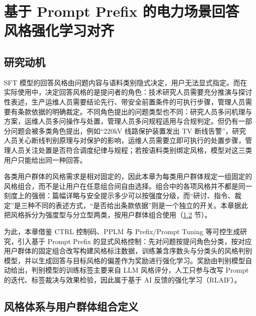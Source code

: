 \documentclass[fontset=fandol,type=master,campus=shenzhen,etitleauto=true]{hithesisbook}
\begin{document}
\chapter{基于 Prompt Prefix 的电力场景回答风格强化学习对齐}\label{ux57faux4e8e-prompt-prefix-ux7684ux7535ux529bux573aux666fux56deux7b54ux98ceux683cux5f3aux5316ux5b66ux4e60ux5bf9ux9f50}

\section{研究动机}\label{ux7814ux7a76ux52a8ux673a-1}

SFT 模型的回答风格由问题内容与语料类别隐式决定，用户无法显式指定。而在实际使用中，决定回答风格的是提问者的角色：技术研究人员需要充分推演与探讨性表述，生产运维人员需要结论先行、带安全前置条件的可执行步骤，管理人员需要有条款依据的明确裁定。不同角色提出的问题类型也不同：研究人员多问机理与方案，运维人员多问操作与处置，管理人员多问规程适用与合规判定。但仍有一部分问题会被多类角色提出，例如“220kV 线路保护装置发出 TV 断线告警”，研究人员关心断线判别原理与对保护的影响，运维人员需要立即可执行的处置步骤，管理人员关注处置是否符合调度纪律与规程；若按语料类别绑定风格，模型对这三类用户只能给出同一种回答。

各类用户群体的风格需求是相对固定的，因此本章为每类用户群体规定一组固定的风格组合，而不是让用户在任意组合间自由选择。组合中的各项风格并不都是同一刻度上的强弱：篇幅详略与安全提示多少可以按强度分级，而“研讨、指令、裁定”是三种不同的表述方式，“是否给出条款依据”则是一个独立的开关。本章据此把风格拆分为强度型与分立型两类，按用户群体组合使用（\ref{ux4e09ux7c7bux98ceux683c-prefix-ux5b9aux4e49} 节）。

为此，本章借鉴 CTRL 控制码、PPLM 与 Prefix/Prompt Tuning 等可控生成研究\cite{ref36,ref37,ref38,ref39}，引入基于 Prompt Prefix 的显式风格控制：先对问题按提问角色分类，按对应用户群体的固定组合改写构建风格标注数据，训练兼含序数头与分类头的风格判别模型，并以生成回答与目标风格的偏差作为奖励进行强化学习。奖励由判别模型自动给出，判别模型的训练标签主要来自 LLM 风格评分，人工只参与改写 Prompt 的迭代、标签裁决与效果检验，因此属于基于 AI 反馈的强化学习（RLAIF）\cite{ref44,ref90}。

\section{风格体系与用户群体组合定义}\label{ux4e09ux7c7bux98ceux683c-prefix-ux5b9aux4e49}
\end{document}
